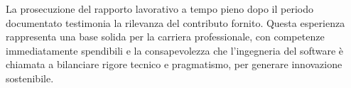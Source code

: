 La prosecuzione del rapporto lavorativo a tempo pieno dopo il periodo documentato
testimonia la rilevanza del contributo fornito. Questa esperienza rappresenta una base solida
per la carriera professionale, con competenze immediatamente spendibili e la consapevolezza
che l'ingegneria del software è chiamata a bilanciare rigore tecnico e pragmatismo,
per generare innovazione sostenibile.